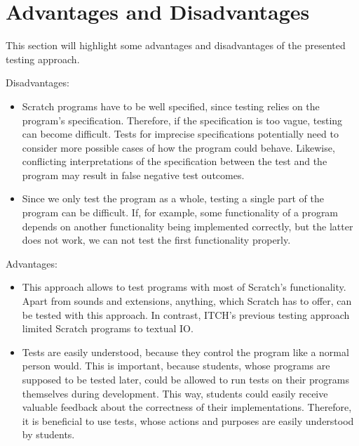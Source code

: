 \section{Advantages and Disadvantages}

This section will highlight some advantages and disadvantages of the presented testing approach.
\parspace


\noindent Disadvantages:

\begin{itemize}
    \item Scratch programs have to be well specified, since testing relies on the program's specification.
        Therefore, if the specification is too vague, testing can become difficult.
        Tests for imprecise specifications potentially need to consider more possible cases of how the program could behave.
        Likewise, conflicting interpretations of the specification between the test and the program may result in false negative test outcomes.
    \item Since we only test the program as a whole, testing a single part of the program can be difficult.
        If, for example, some functionality of a program depends on another functionality being implemented correctly,
        but the latter does not work, we can not test the first functionality properly.
\end{itemize}

\noindent Advantages:

\begin{itemize}
    \item This approach allows to test programs with most of Scratch's functionality.
        Apart from sounds and extensions, anything, which Scratch has to offer, can be tested with this approach.
        In contrast, ITCH's previous testing approach limited Scratch programs to textual IO.
    \item Tests are easily understood, because they control the program like a normal person would.
        This is important, because students, whose programs are supposed to be tested later,
        could be allowed to run tests on their programs themselves during development.
        This way, students could easily receive valuable feedback about the correctness of their implementations.
        Therefore, it is beneficial to use tests, whose actions and purposes are easily understood by students.
\end{itemize}

